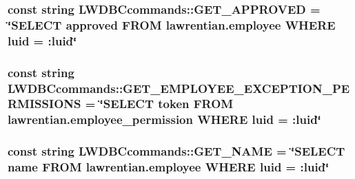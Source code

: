 \subsubsection[{G\+E\+T\+\_\+\+A\+P\+P\+R\+O\+V\+E\+D}]{\setlength{\rightskip}{0pt plus 5cm}const string L\+W\+D\+B\+Ccommands\+::\+G\+E\+T\+\_\+\+A\+P\+P\+R\+O\+V\+E\+D = \char`\"{}S\+E\+L\+E\+C\+T approved F\+R\+O\+M lawrentian.\+employee W\+H\+E\+R\+E luid = \+:luid\char`\"{}}\label{namespace_l_w_d_b_ccommands_a9b4deb87585d30ea401b83064fa5519b}
\hypertarget{namespace_l_w_d_b_ccommands_a056cd3ecf83a40957cb6abc1b82b4c73}{}
\subsubsection[{G\+E\+T\+\_\+\+E\+M\+P\+L\+O\+Y\+E\+E\+\_\+\+E\+X\+C\+E\+P\+T\+I\+O\+N\+\_\+\+P\+E\+R\+M\+I\+S\+S\+I\+O\+N\+S}]{\setlength{\rightskip}{0pt plus 5cm}const string L\+W\+D\+B\+Ccommands\+::\+G\+E\+T\+\_\+\+E\+M\+P\+L\+O\+Y\+E\+E\+\_\+\+E\+X\+C\+E\+P\+T\+I\+O\+N\+\_\+\+P\+E\+R\+M\+I\+S\+S\+I\+O\+N\+S = \char`\"{}S\+E\+L\+E\+C\+T token F\+R\+O\+M lawrentian.\+employee\+\_\+permission W\+H\+E\+R\+E luid = \+:luid\char`\"{}}\label{namespace_l_w_d_b_ccommands_a056cd3ecf83a40957cb6abc1b82b4c73}
\hypertarget{namespace_l_w_d_b_ccommands_a6dcdf2d4cdf87e217b4c8a5c3be048c9}{}
\subsubsection[{G\+E\+T\+\_\+\+N\+A\+M\+E}]{\setlength{\rightskip}{0pt plus 5cm}const string L\+W\+D\+B\+Ccommands\+::\+G\+E\+T\+\_\+\+N\+A\+M\+E = \char`\"{}S\+E\+L\+E\+C\+T name F\+R\+O\+M lawrentian.\+employee W\+H\+E\+R\+E luid = \+:luid\char`\"{}}\label{namespace_l_w_d_b_ccommands_a6dcdf2d4cdf87e217b4c8a5c3be048c9}
\hypertarget{namespace_l_w_d_b_ccommands_a036f332657ac52041a58c6b08d353016}{}

